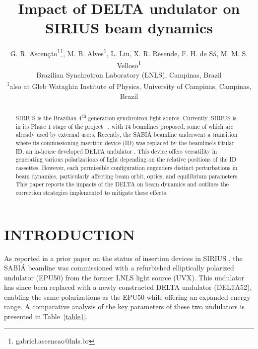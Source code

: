 \documentclass[a4paper,
               keeplastbox,   %
               ]{jacow}
\begin{document}
\title{Impact of DELTA undulator on SIRIUS beam dynamics }

\author{G. R. Ascenção\textsuperscript{1}\thanks{gabriel.ascencao@lnls.br}, M. B. Alves\textsuperscript{1}, L. Liu, X. R. Resende, F. H. de Sá, M. M. S. Velloso\textsuperscript{1}\\ Brazilian Synchrotron Laboratory (LNLS), Campinas, Brazil \\
\textsuperscript{1}also at Gleb Wataghin Institute of Physics, University of Campinas, Campinas, Brazil
}

	
\maketitle
%
\begin{abstract}
SIRIUS is the Brazilian 4\textsuperscript{th} generation synchrotron light source. Currently, SIRIUS is in its Phase 1 stage of the project ~\cite{Liu:IPAC23-WEOGA2, Beamlines}, with 14 beamlines proposed, some of which are already used by external users. Recently, the SABIÁ beamline underwent a transition where its commissioning insertion device (ID) was replaced by the beamline's titular ID, an in-house developed DELTA undulator  \cite{Vilela:IPAC17-WEPIK053, Vilela:IPAC18-TUPMK003}. This device offers versatility in generating various polarizations of light depending on the relative positions of the ID cassettes. However,  each permissible configuration engenders distinct perturbations in beam dynamics, particularly affecting beam orbit, optics, and equilibrium parameters. This paper reports the impacts of the DELTA on beam dynamics and outlines the correction strategies implemented to mitigate these effects.
\end{abstract}


\section{INTRODUCTION}

As reported in a prior paper on the status of insertion devices in SIRIUS \cite{Ascenção:IPAC23-MOPM088}, the SABIÁ beamline was commissioned with a refurbished elliptically polarized undulator (EPU50) from the former LNLS light source (UVX). This undulator has since been replaced with a newly constructed DELTA undulator (DELTA52), enabling the same polarizations as the EPU50 while offering an expanded energy range. A comparative analysis of the key parameters of these two undulators is presented in Table~\ref{table1}.
\end{document}
